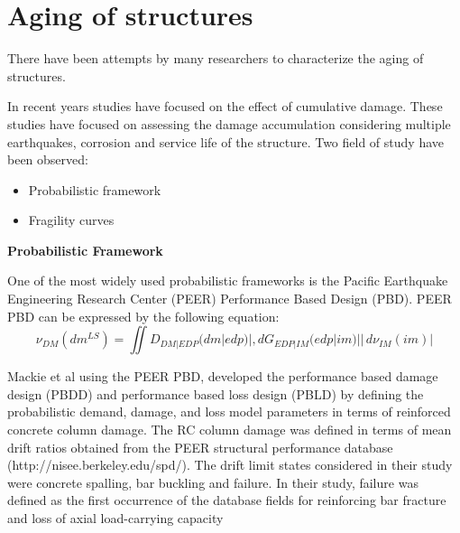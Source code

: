 \section{Aging of structures}

There have been attempts by many researchers to characterize the aging of structures.

In recent years studies have focused on the effect of cumulative damage. These studies have focused on assessing the damage accumulation considering multiple earthquakes, corrosion and service life of the structure. Two field of study have been observed:

\begin{itemize}
	\item Probabilistic framework
	\item Fragility curves
\end{itemize}

\textbf{Probabilistic Framework}

One of the most widely used probabilistic frameworks is the Pacific Earthquake Engineering Research Center (PEER) Performance Based Design (PBD). PEER PBD can be expressed by the following equation:
\begin{equation}
\nu_{DM}(dm^{LS})=\iint D_{DM|EDP}(dm|edp)|,dG_{EDP|IM}(edp|im)||\,d\nu_{IM}(im)|
\end{equation}

Mackie et al \cite{Mackie2007} using  the PEER PBD, developed the performance based damage design (PBDD) and performance based loss design (PBLD) by defining the probabilistic demand, damage, and loss model parameters in terms of reinforced concrete column damage. The RC column damage was defined in terms of mean drift ratios obtained from the PEER structural performance database (http://nisee.berkeley.edu/spd/). The drift limit states considered in their study were concrete spalling, bar buckling and failure. In their study, failure was defined as the first occurrence of the database fields for reinforcing bar fracture and loss of axial load-carrying capacity 

